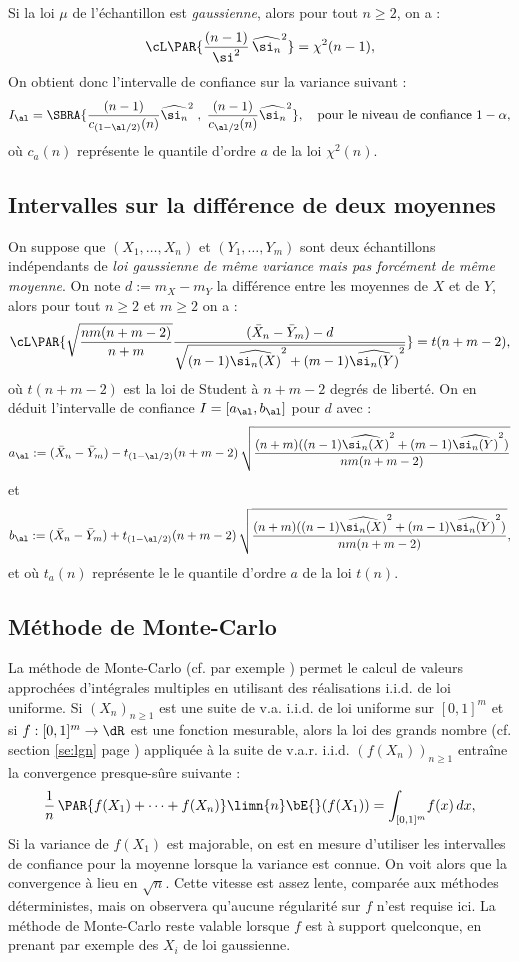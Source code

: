 Si la loi $\mu$ de l'échantillon est \emph{gaussienne}, alors
pour tout $n \geq 2$, on a :
$$
\cL\PAR{\frac{(n-1)}{\si^2}\,\widehat{\si_n}^2} = \chi^2 (n-1),
$$
On obtient donc l'intervalle de confiance sur la variance suivant :
$$
I_\al=\SBRA{\frac{(n-1)}{c_{(1-\al/2)}(n)}\widehat{\si_n}^2\;,\; 
  \frac{(n-1)}{c_{\al/2}(n)}\widehat{\si_n}^2},
\text{\quad pour le niveau de confiance $1-\alpha$},
$$
où $c_a(n)$ représente le quantile d'ordre $a$ de la loi $\chi^2(n)$.

\subsection{Intervalles sur la différence de deux moyennes}

On suppose que $(X_1,\ldots,X_n)$ et $(Y_1,\ldots,Y_m)$ sont deux échantillons
indépendants de \emph{loi gaussienne de même variance mais pas forcément de
  même moyenne}. On note $d:=m_X-m_Y$ la différence entre les moyennes de $X$
et de $Y$, alors pour tout $n \geq 2$ et $m \geq 2$ on a :
$$ 
\cL\PAR{
\sqrt{\frac{nm(n+m-2)}{n+m}} 
\frac{(\bar{X}_n-\bar{Y}_m)-d}
{\sqrt{(n-1)\widehat{\si_n(X)}^2+(m-1)\widehat{\si_n(Y)}^2}}}
=t(n+m-2),
$$
où $t(n+m-2)$ est la loi de Student à $n+m-2$ degrés de liberté. On en
déduit l'intervalle de confiance $I=[a_\al,b_\al]$ pour $d$ avec :
$$
a_\al:=(\bar{X}_n-\bar{Y}_m)-t_{(1-\al/2)}(n+m-2)\,
       \sqrt{\frac{(n+m)((n-1)\widehat{\si_n(X)}^2
                     +(m-1)\widehat{\si_n(Y)}^2)}{nm(n+m-2)}}
$$
et
$$
b_\al:=(\bar{X}_n -\bar{Y}_m)+t_{(1-\al/2)}(n+m-2)\,
       \sqrt{\frac{(n+m)((n-1)\widehat{\si_n(X)}^2
                   +(m-1)\widehat{\si_n(Y)}^2)}{nm(n+m-2)}},
$$
et où $t_a(n)$ représente le le quantile d'ordre $a$ de la loi $t(n)$.


%
\subsection{Méthode de Monte-Carlo}\label{ss:mc}
%

La méthode de Monte-Carlo (cf. par exemple \cite[p. 103]{dacunha-castelle-duflo})
permet le calcul de valeurs approchées d'intégrales multiples en utilisant des
réalisations i.i.d. de loi uniforme. Si $(X_n)_{n\geq 1}$ est une suite de
v.a. i.i.d. de loi uniforme sur $[0,1]^m$ et si $f:[0,1]^m\to\dR$ est une
fonction mesurable, alors la loi des grands nombre (cf. section \ref{se:lgn}
page \pageref{se:lgn}) appliquée à la suite de v.a.r. i.i.d. $(f(X_n))_{n\geq
  1}$ entraîne la convergence presque-sûre suivante :
$$
\frac{1}{n}\,\PAR{f(X_1)+\cdots+f(X_n)}
\limn{n}
\bE{}(f(X_1))=\int_{[0,1]^m}\! f(x)\,dx,
$$
Si la variance de $f(X_1)$ est majorable, on est en mesure d'utiliser les
intervalles de confiance pour la moyenne lorsque la variance est connue. On
voit alors que la convergence à lieu en $\sqrt{n}$. Cette vitesse est assez
lente, comparée aux méthodes déterministes, mais on observera qu'aucune
régularité sur $f$ n'est requise ici. La méthode de Monte-Carlo reste valable
lorsque $f$ est à support quelconque, en prenant par exemple des $X_i$ de loi
gaussienne.

